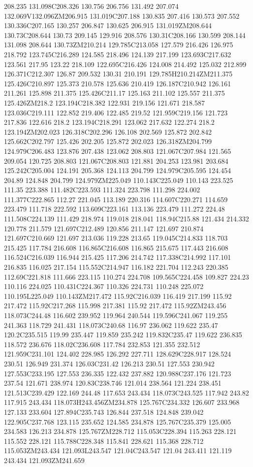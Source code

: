 208.235 131.098C208.326 130.756 206.756 131.492 207.074 132.069V132.096ZM206.915 131.019C207.188 130.835 207.416 130.573 207.552 130.336C207.165 130.257 206.847 130.625 206.915 131.019ZM208.644 130.73C208.644 130.73 209.145 129.916 208.576 130.31C208.166 130.599 208.144 131.098 208.644 130.73ZM210.214 129.785C213.058 127.579 216.426 126.975 218.792 123.745C216.289 124.585 218.496 124.139 217.199 123.693C217.632 123.561 217.95 123.22 218.109 122.695C216.426 124.008 214.492 125.032 212.899 126.371C212.307 126.87 209.532 130.31 210.191 129.785H210.214ZM211.375 125.426C210.897 125.373 210.578 125.636 210.419 126.187C210.942 126.161 211.261 125.898 211.375 125.426C211.17 125.163 211.102 125.557 211.375 125.426ZM218.2 123.194C218.382 122.931 219.156 121.671 218.587 123.036C219.111 122.852 219.406 122.485 219.52 121.959C219.156 121.723 217.836 122.616 218.2 123.194C218.291 123.062 217.632 122.274 218.2 123.194ZM202.023 126.318C202.296 126.108 202.569 125.872 202.842 125.662C202.797 125.426 202.205 125.872 202.023 126.318ZM204.799 124.979C206.483 123.876 207.438 123.062 208.803 121.067C207.984 121.565 209.054 120.725 208.803 121.067C208.803 121.881 204.253 123.981 203.684 125.242C205.004 124.191 205.368 124.113 204.799 124.979C205.595 124.454 204.89 124.848 204.799 124.979ZM225.049 110.143C225.049 110.143 223.525 111.35 223.388 111.482C223.593 111.324 223.798 111.298 224.002 111.377C222.865 112.27 221.045 113.189 220.316 114.607C220.271 114.659 223.479 111.718 222.592 113.609C223.161 113.136 223.479 111.272 224.48 111.508C224.139 111.429 218.974 119.018 218.041 118.94C215.88 121.434 214.332 120.778 211.579 121.697C212.489 120.856 211.147 121.697 210.874 121.697C210.669 121.697 213.036 119.228 213.65 119.045C214.833 118.703 215.425 117.784 216.608 116.865C216.608 116.865 215.675 117.443 216.608 116.524C216.039 116.944 215.425 117.206 214.742 117.338C214.992 117.101 216.835 116.025 217.154 115.552C214.947 116.182 221.704 112.243 220.385 112.69C221.818 111.666 223.115 110.274 224.708 109.565C224.458 109.827 224.23 110.116 224.025 110.431C224.367 110.326 224.731 110.248 225.072 110.195L225.049 110.143ZM217.472 115.92C216.039 116.419 217.199 115.92 217.472 115.92C217.268 115.998 217.381 115.92 217.472 115.92ZM243.456 118.073C244.48 116.602 239.952 119.964 240.544 119.596C241.067 119.255 241.363 118.729 241.431 118.073C240.68 116.97 236.062 119.622 235.47 120.2C235.515 119.99 235.447 119.859 235.242 119.832C235.47 119.622 236.835 118.572 236.676 118.02C236.608 117.784 232.853 121.355 232.512 121.959C231.101 124.402 228.985 126.292 227.711 128.629C228.917 128.524 230.51 126.949 231.374 126.03C231.42 126.213 230.51 127.553 230.942 127.553C233.195 127.553 236.335 122.432 237.882 120.988C237.176 121.723 237.54 121.671 238.974 120.83C238.746 121.014 238.564 121.224 238.451 121.513C239.429 122.169 244.48 117.653 243.434 118.073C243.525 117.942 243.82 117.915 243.434 118.073H243.456ZM234.878 125.767C234.332 126.607 233.968 127.133 233.604 127.894C235.743 126.844 237.518 124.848 239.042 122.905C237.768 123.115 235.652 124.585 234.878 125.767C235.379 125.005 234.583 126.213 234.878 125.767ZM228.712 115.053C228.394 115.263 228.121 115.552 228.121 115.788C228.348 115.841 228.621 115.368 228.712 115.053ZM243.434 121.093L243.547 121.04C243.547 121.04 243.411 121.119 243.434 121.093ZM241.659 